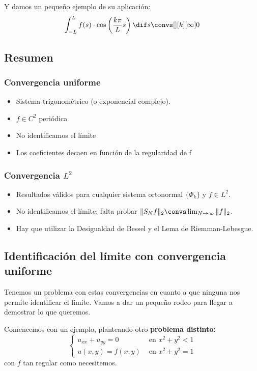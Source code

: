 			Y damos un pequeño ejemplo de su aplicación:
				\[ \int_{-L}^{L} f(s) \cdot \cos\left(\frac{k\pi}{L}s\right) \dif s \convs[ ][k][\infty] 0 \]


	\subsection{Resumen}

		\subsubsection*{Convergencia uniforme}

			\begin{itemize}[itemsep = 0pt]
				\item Sistema trigonométrico (o exponencial complejo).
				\item $f \in C^2$ periódica
				\item No identificamos el límite
				\item Los coeficientes decaen en función de la regularidad de f
			\end{itemize}

		\subsubsection*{Convergencia $L^2$}

			\begin{itemize}[itemsep = 0pt]
				\item Resultados válidos para cualquier sistema ortonormal $\{ \Phi_k \}$ y  $f \in L^2$.
				\item No identificamos el límite: falta probar $\|S_N f\|_2 \convs \lim_{N \to \infty} \|f\|_2$.
				\item Hay que utilizar la Desigualdad de Bessel y el Lema de Riemman-Lebesgue.
			\end{itemize}

		\subsection{Identificación del límite con convergencia uniforme}

		Tenemos un problema con estas convergencias en cuanto a que ninguna nos permite identificar el límite. Vamos a dar un pequeño rodeo para llegar a demostrar lo que queremos.

		Comencemos con un ejemplo, planteando otro \textbf{problema distinto:}
		\[
			\begin{cases}
				u_{xx} + u_{yy} = 0 & \text{ en } x^2 + y^2 < 1 \\
				u(x,y) = f(x,y) & \text{ en } x^2 + y^2 = 1
			\end{cases}
		\]
		con $f$ tan regular como necesitemos.

